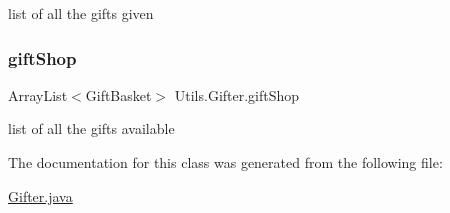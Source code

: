 list of all the gifts given \mbox{\label{class_utils_1_1_gifter_aa187a1420fc0e9574e2281622d544091}} 
\subsubsection{\texorpdfstring{gift\+Shop}{giftShop}}
{\footnotesize\ttfamily Array\+List$<$Gift\+Basket$>$ Utils.\+Gifter.\+gift\+Shop}

list of all the gifts available 

The documentation for this class was generated from the following file\+:\begin{DoxyCompactItemize}
\item 
\hyperlink{_gifter_8java}{Gifter.\+java}\end{DoxyCompactItemize}

